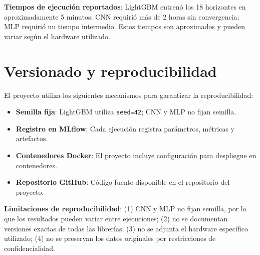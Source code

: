\textbf{Tiempos de ejecución reportados}: LightGBM entrenó los 18 horizontes en aproximadamente 5 minutos; CNN requirió más de 2 horas sin convergencia; MLP requirió un tiempo intermedio. Estos tiempos son aproximados y pueden variar según el hardware utilizado.

\section{Versionado y reproducibilidad}

El proyecto utiliza los siguientes mecanismos para garantizar la reproducibilidad:

\begin{itemize}
    \item \textbf{Semilla fija}: LightGBM utiliza \texttt{seed=42}; CNN y MLP no fijan semilla.
    \item \textbf{Registro en MLflow}: Cada ejecución registra parámetros, métricas y artefactos.
    \item \textbf{Contenedores Docker}: El proyecto incluye configuración para despliegue en contenedores.
    \item \textbf{Repositorio GitHub}: Código fuente disponible en el repositorio del proyecto.
\end{itemize}

\textbf{Limitaciones de reproducibilidad}: (1) CNN y MLP no fijan semilla, por lo que los resultados pueden variar entre ejecuciones; (2) no se documentan versiones exactas de todas las librerías; (3) no se adjunta el hardware específico utilizado; (4) no se preservan los datos originales por restricciones de confidencialidad.